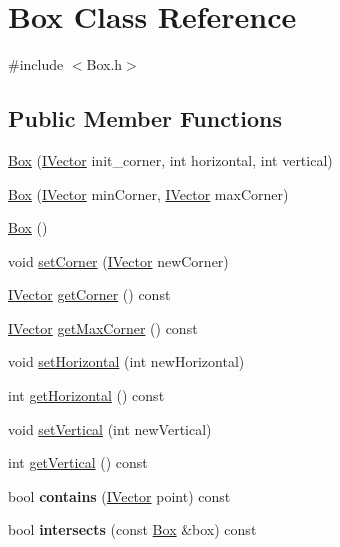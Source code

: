 \hypertarget{class_box}{\section{Box Class Reference}
\label{class_box}
}


{\ttfamily \#include $<$Box.\+h$>$}

\subsection*{Public Member Functions}
\begin{DoxyCompactItemize}
\item 
\hyperlink{class_box_aebf2dc1ce4038ddc90d951c45a540eb8}{Box} (\hyperlink{class_i_vector}{I\+Vector} init\+\_\+corner, int horizontal, int vertical)
\item 
\hyperlink{class_box_aaa0135bed67525224f69b261a6aed814}{Box} (\hyperlink{class_i_vector}{I\+Vector} min\+Corner, \hyperlink{class_i_vector}{I\+Vector} max\+Corner)
\item 
\hyperlink{class_box_aca78d7db44972bfa78d46b7bbc8796f6}{Box} ()
\item 
void \hyperlink{class_box_a86aefb1c5a6fa0df2cd1dd5a4977e48f}{set\+Corner} (\hyperlink{class_i_vector}{I\+Vector} new\+Corner)
\item 
\hyperlink{class_i_vector}{I\+Vector} \hyperlink{class_box_a6c1847429306010f8aa73b0e1eada797}{get\+Corner} () const 
\item 
\hyperlink{class_i_vector}{I\+Vector} \hyperlink{class_box_a3d563f696482a8b25e9ce239384ce14a}{get\+Max\+Corner} () const 
\item 
void \hyperlink{class_box_a92c69d5bb53cb167a6b51707738b12aa}{set\+Horizontal} (int new\+Horizontal)
\item 
int \hyperlink{class_box_a53f17f94650385c7fd770e93b531a5ab}{get\+Horizontal} () const 
\item 
void \hyperlink{class_box_ae45c7ed4dba774e88b96ddf28b1ace16}{set\+Vertical} (int new\+Vertical)
\item 
int \hyperlink{class_box_ab522f2c5403c6d846c3f66413fe31b30}{get\+Vertical} () const 
\item 
\hypertarget{class_box_a1af8da64e7d0c5363ebb47c31364ed4c}{bool {\bfseries contains} (\hyperlink{class_i_vector}{I\+Vector} point) const }\label{class_box_a1af8da64e7d0c5363ebb47c31364ed4c}

\item 
\hypertarget{class_box_a70768bab9f94277222ce5ea23a0c27b4}{bool {\bfseries intersects} (const \hyperlink{class_box}{Box} \&box) const }\label{class_box_a70768bab9f94277222ce5ea23a0c27b4}


\end{DoxyCompactItemize}
